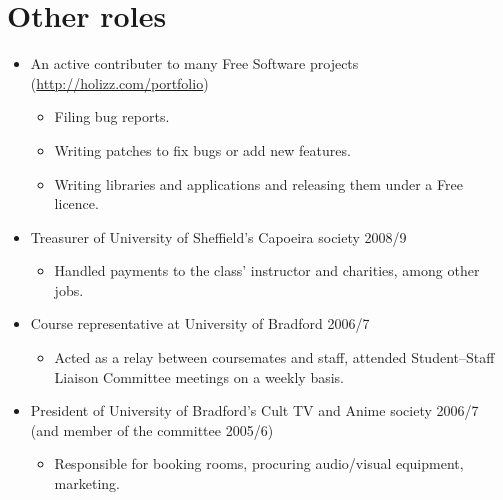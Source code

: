 \documentclass{article}
\newcommand{\iri}[1]{\url{#1}}
\begin{document}
\section{Other roles}
\begin{itemize}
\item An active contributer to many Free Software projects (\iri{http://holizz.com/portfolio})
  \begin{itemize}
  \item Filing bug reports.
  \item Writing patches to fix bugs or add new features.
  \item Writing libraries and applications and releasing them under a Free licence.
  \end{itemize}
\item Treasurer of University of Sheffield's Capoeira society 2008/9
  \begin{itemize}
  \item Handled payments to the class' instructor and charities, among other jobs.
  \end{itemize}
\item Course representative at University of Bradford 2006/7
  \begin{itemize}
  \item Acted as a relay between coursemates and staff, attended Student--Staff Liaison Committee meetings on a weekly basis.
  \end{itemize}
\item President of University of Bradford's Cult TV and Anime society 2006/7 (and member of the committee 2005/6)
  \begin{itemize}
  \item Responsible for booking rooms, procuring audio/visual equipment, marketing.
  \end{itemize}
\end{itemize}

\break
\end{document}
